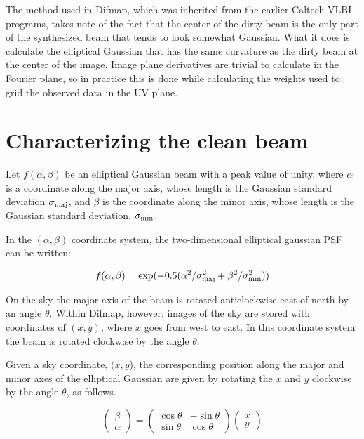 \documentclass[11pt]{article}
\newcommand{\bpa}{\theta}
\newcommand{\minor}{\sigma_{\mbox{\scriptsize min}}}
\newcommand{\major}{\sigma_{\mbox{\scriptsize maj}}}
\begin{document}
The method used in Difmap, which was inherited from the earlier
Caltech VLBI programs, takes note of the fact that the center of the
dirty beam is the only part of the synthesized beam that tends to look
somewhat Gaussian. What it does is calculate the elliptical Gaussian
that has the same curvature as the dirty beam at the center of the
image. Image plane derivatives are trivial to calculate in the Fourier
plane, so in practice this is done while calculating the weights used
to grid the observed data in the UV plane.

\section{Characterizing the clean beam}

Let $f(\alpha,\beta)$ be an elliptical Gaussian beam with a peak value
of unity, where $\alpha$ is a coordinate along the major axis, whose
length is the Gaussian standard deviation $\major$, and $\beta$ is the
coordinate along the minor axis, whose length is the Gaussian standard
deviation, $\minor$.

In the $(\alpha,\beta)$ coordinate system, the two-dimensional
elliptical gaussian PSF can be written:

\begin{equation}
\label{gaussian_eqn}
  f(\alpha,\beta) = \exp(-0.5 (\alpha^2 / \major^2 + \beta^2 / \minor^2))
\end{equation}

On the sky the major axis of the beam is rotated anticlockwise east of
north by an angle $\bpa$. Within Difmap, however, images of the sky
are stored with coordinates of $(x,y)$, where $x$ goes from west to
east. In this coordinate system the beam is rotated clockwise by the
angle $\bpa$.

Given a sky coordinate, $(x,y$), the corresponding position along the
major and minor axes of the elliptical Gaussian are given by rotating
the $x$ and $y$ clockwise by the angle $\bpa$, as follows.

\begin{equation}
\begin{pmatrix}
\beta \\
\alpha
\end{pmatrix}
=
\begin{pmatrix}
    \cos{\bpa} & -\sin{\bpa}\\
    \sin{\bpa} &  \cos{\bpa}
\end{pmatrix}
\begin{pmatrix}
x \\
y
\end{pmatrix}
\end{equation}
\end{document}
